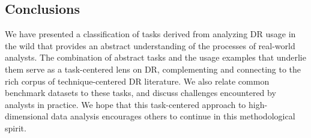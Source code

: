 
\subsection{Conclusions}
\label{app:drvistasks:dritw:conclusion}


We have presented a classification of tasks derived from analyzing \ac{DR} usage in the wild that provides an abstract understanding of the processes of real-world analysts.
The combination of abstract tasks and the usage examples that underlie them serve as a task-centered lens on \ac{DR}, complementing and connecting to the rich corpus of technique-centered \ac{DR} literature. 
We also relate common benchmark datasets to these tasks, and 
discuss challenges encountered by analysts in practice.
We hope that this task-centered approach to high-dimensional data analysis encourages others to continue in this methodological spirit. 
